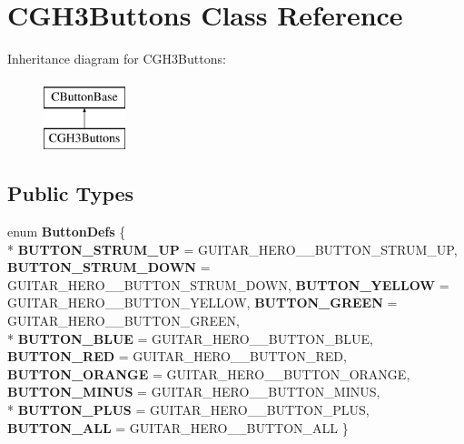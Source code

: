 \hypertarget{class_c_g_h3_buttons}{\section{C\-G\-H3\-Buttons Class Reference}
\label{class_c_g_h3_buttons}
}
Inheritance diagram for C\-G\-H3\-Buttons\-:\begin{figure}[H]
\begin{center}
\leavevmode
\includegraphics[height=2.000000cm]{class_c_g_h3_buttons}
\end{center}
\end{figure}
\subsection*{Public Types}
\begin{DoxyCompactItemize}
\item 
enum {\bfseries Button\-Defs} \{ \\*
{\bfseries B\-U\-T\-T\-O\-N\-\_\-\-S\-T\-R\-U\-M\-\_\-\-U\-P} =  G\-U\-I\-T\-A\-R\-\_\-\-H\-E\-R\-O\-\_\-\_\-\-B\-U\-T\-T\-O\-N\-\_\-\-S\-T\-R\-U\-M\-\_\-\-U\-P, 
{\bfseries B\-U\-T\-T\-O\-N\-\_\-\-S\-T\-R\-U\-M\-\_\-\-D\-O\-W\-N} =  G\-U\-I\-T\-A\-R\-\_\-\-H\-E\-R\-O\-\_\-\_\-\-B\-U\-T\-T\-O\-N\-\_\-\-S\-T\-R\-U\-M\-\_\-\-D\-O\-W\-N, 
{\bfseries B\-U\-T\-T\-O\-N\-\_\-\-Y\-E\-L\-L\-O\-W} =  G\-U\-I\-T\-A\-R\-\_\-\-H\-E\-R\-O\-\_\-\_\-\-B\-U\-T\-T\-O\-N\-\_\-\-Y\-E\-L\-L\-O\-W, 
{\bfseries B\-U\-T\-T\-O\-N\-\_\-\-G\-R\-E\-E\-N} =  G\-U\-I\-T\-A\-R\-\_\-\-H\-E\-R\-O\-\_\-\_\-\-B\-U\-T\-T\-O\-N\-\_\-\-G\-R\-E\-E\-N, 
\\*
{\bfseries B\-U\-T\-T\-O\-N\-\_\-\-B\-L\-U\-E} =  G\-U\-I\-T\-A\-R\-\_\-\-H\-E\-R\-O\-\_\-\_\-\-B\-U\-T\-T\-O\-N\-\_\-\-B\-L\-U\-E, 
{\bfseries B\-U\-T\-T\-O\-N\-\_\-\-R\-E\-D} =  G\-U\-I\-T\-A\-R\-\_\-\-H\-E\-R\-O\-\_\-\_\-\-B\-U\-T\-T\-O\-N\-\_\-\-R\-E\-D, 
{\bfseries B\-U\-T\-T\-O\-N\-\_\-\-O\-R\-A\-N\-G\-E} =  G\-U\-I\-T\-A\-R\-\_\-\-H\-E\-R\-O\-\_\-\_\-\-B\-U\-T\-T\-O\-N\-\_\-\-O\-R\-A\-N\-G\-E, 
{\bfseries B\-U\-T\-T\-O\-N\-\_\-\-M\-I\-N\-U\-S} =  G\-U\-I\-T\-A\-R\-\_\-\-H\-E\-R\-O\-\_\-\_\-\-B\-U\-T\-T\-O\-N\-\_\-\-M\-I\-N\-U\-S, 
\\*
{\bfseries B\-U\-T\-T\-O\-N\-\_\-\-P\-L\-U\-S} =  G\-U\-I\-T\-A\-R\-\_\-\-H\-E\-R\-O\-\_\-\_\-\-B\-U\-T\-T\-O\-N\-\_\-\-P\-L\-U\-S, 
{\bfseries B\-U\-T\-T\-O\-N\-\_\-\-A\-L\-L} =  G\-U\-I\-T\-A\-R\-\_\-\-H\-E\-R\-O\-\_\-\_\-\-B\-U\-T\-T\-O\-N\-\_\-\-A\-L\-L
 \}
\end{DoxyCompactItemize}
